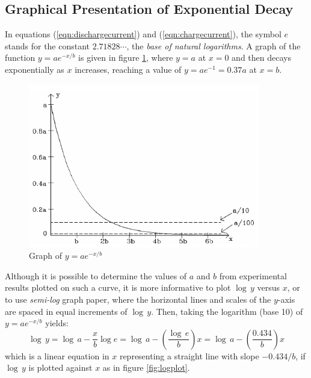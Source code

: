 \subsection{Graphical Presentation of Exponential Decay}

In equations (\ref{eqn:dischargecurrent}) and (\ref{eqn:chargecurrent}), the symbol $e$ stands for the constant $2.71828\cdots$, the \emph{base of natural logarithms}. A graph of the function $y = ae^{-x/b}$ is given in figure \ref{fig:expgraph}, where $y=a$ at $x=0$ and then decays exponentially as $x$ increases, reaching a value of $y = ae^{-1} = 0.37a$ at $x=b$.

\begin{figure}[h]
    \begin{center}
        \includegraphics[width=0.9\textwidth]{./Exp3/pic/image4.png}
    \end{center}
    \caption{Graph of $y=ae^{-x/b}$}
    \label{fig:expgraph}
\end{figure}

Although it is possible to determine the values of $a$ and $b$ from experimental results plotted on such a curve, it is more informative to plot $\log\,y$ versus $x$, or to use \emph{semi-log} graph paper, where the horizontal lines and scales of the $y$-axis are spaced in equal increments of $\log\,y$. Then, taking the logarithm (base 10) of $y=ae^{-x/b}$ yields:
\begin{equation}
    \log\,y = \log\,a - \frac{x}{b}\log e = \log\,a - \left( \frac{\log\,e}{b} \right)x = \log\,a - \left( \frac{0.434}{b} \right)x
    \label{eqn:logslope}
\end{equation}
which is a linear equation in $x$ representing a straight line with slope $-0.434/b$, if $\log\,y$ is plotted against $x$ as in figure \ref{fig:logplot}. \myskip

